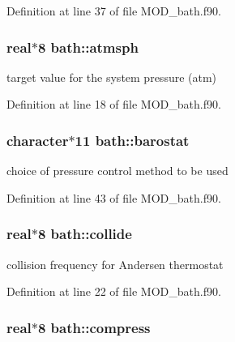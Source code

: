Definition at line 37 of file M\-O\-D\-\_\-bath.\-f90.

\hypertarget{classbath_af51ab3bffc1008a8d519372e3a3b29f0}{
\subsubsection[{atmsph}]{\setlength{\rightskip}{0pt plus 5cm}real$\ast$8 bath\-::atmsph}}\label{classbath_af51ab3bffc1008a8d519372e3a3b29f0}


target value for the system pressure (atm) 



Definition at line 18 of file M\-O\-D\-\_\-bath.\-f90.

\hypertarget{classbath_a1f37229303acc7597c01ca348b462709}{
\subsubsection[{barostat}]{\setlength{\rightskip}{0pt plus 5cm}character$\ast$11 bath\-::barostat}}\label{classbath_a1f37229303acc7597c01ca348b462709}


choice of pressure control method to be used 



Definition at line 43 of file M\-O\-D\-\_\-bath.\-f90.

\hypertarget{classbath_a911ccc561fe5c658057896f4017a1e85}{
\subsubsection[{collide}]{\setlength{\rightskip}{0pt plus 5cm}real$\ast$8 bath\-::collide}}\label{classbath_a911ccc561fe5c658057896f4017a1e85}


collision frequency for Andersen thermostat 



Definition at line 22 of file M\-O\-D\-\_\-bath.\-f90.

\hypertarget{classbath_a97576d3970570db82ab1f8c50aaff73f}{
\subsubsection[{compress}]{\setlength{\rightskip}{0pt plus 5cm}real$\ast$8 bath\-::compress}}\label{classbath_a97576d3970570db82ab1f8c50aaff73f}


